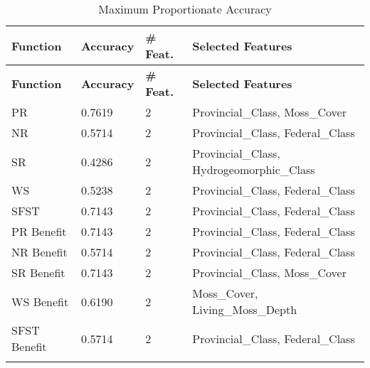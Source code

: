 \begin{longtable}{|p{3cm}|p{2cm}|p{2cm}|p{8cm}|}
\hline
\textbf{Function} & \textbf{Accuracy} & \textbf{\# Feat.} & \textbf{Selected Features} \\ \hline
\endfirsthead
\hline
\textbf{Function} & \textbf{Accuracy} & \textbf{\# Feat.} & \textbf{Selected Features} \\ \hline
\endhead

PR & 0.7619 & 2 & Provincial\_Class, Moss\_Cover \\ \hline
NR & 0.5714 & 2 & Provincial\_Class, Federal\_Class \\ \hline
SR & 0.4286 & 2 & Provincial\_Class, Hydrogeomorphic\_Class \\ \hline
WS & 0.5238 & 2 & Provincial\_Class, Federal\_Class \\ \hline
SFST & 0.7143 & 2 & Provincial\_Class, Federal\_Class \\ \hline
PR Benefit & 0.7143 & 2 & Provincial\_Class, Federal\_Class \\ \hline
NR Benefit & 0.5714 & 2 & Provincial\_Class, Federal\_Class \\ \hline
SR Benefit & 0.7143 & 2 & Provincial\_Class, Moss\_Cover \\ \hline
WS Benefit & 0.6190 & 2 & Moss\_Cover, Living\_Moss\_Depth \\ \hline
SFST Benefit & 0.5714 & 2 & Provincial\_Class, Federal\_Class \\ \hline

\caption{Maximum Proportionate Accuracy}
\label{tab_class_xtra:ensemble_prop_class_acc}
\end{longtable}
